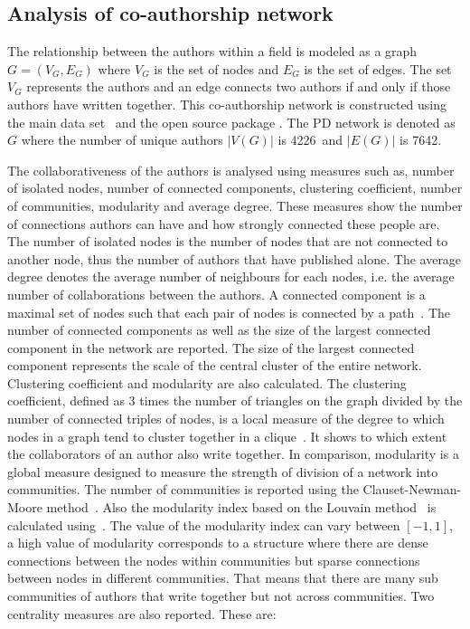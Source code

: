 \documentclass{article}
\theoremstyle{definition}
\newcommand{\authors}{4226}
\newcommand{\edges}{7642}
\begin{document}
\subsection{Analysis of co-authorship network}\label{subsection:co_authorship}

The relationship between the authors within a field is modeled as a graph
\(G = (V_G, E_G)\) where \(V_G\) is the set of nodes and \(E_G\)  is the set of
edges. The set \(V_G\) represents the authors and an edge connects two authors
if and only if those authors have written together. This co-authorship network is
constructed using the main data set~\citep{pd_data_2018} and the open source package
\citep{networkx}. The PD network is denoted as \(G\) where the
number of unique authors \(|V(G)|\) is \authors~and \(|E(G)|\) is \edges.


The collaborativeness of the authors is analysed using measures such as, number of isolated nodes,
number of connected components, clustering coefficient, number of communities, modularity and average degree.
These measures show the number of connections authors can have
and how strongly connected these people are. The number of isolated nodes is the
number of nodes that are not connected to another node, thus the
number of authors that have published alone. The average degree denotes the average
number of neighbours for each nodes, i.e. the average number of collaborations
between the authors.
A connected component is a maximal set of nodes such that each pair of nodes is
connected by a path~\citep{Easley2010}. The number of connected components as well as the size of the
largest connected component in the network are reported.
The size of the largest connected component represents the scale of the central cluster
of the entire network.
Clustering coefficient and modularity are also calculated. The clustering
coefficient, defined as 3 times the number of triangles on the graph divided
by the number of connected triples of nodes, is a local measure of the degree to
which nodes in a graph tend to cluster together
in a clique~\citep{Easley2010}. It shows to which extent the collaborators
of an author also write together.
In comparison, modularity is a global measure designed to measure the strength of
division of a network into communities. The number of communities is reported
using the Clauset-Newman-Moore method~\citep{clauset2004}. Also the modularity index
based on the Louvain method~\citep{Blondel2008} is calculated using~\citep{python_louvain}. The value
of the modularity index can vary between \([-1, 1]\), a high value of modularity
corresponds to a structure where there are dense connections between the nodes within
communities but sparse connections between nodes in different communities.
That means that there are many sub communities of authors that write together
but not across communities.
Two centrality measures are also reported. These are:
\end{document}
